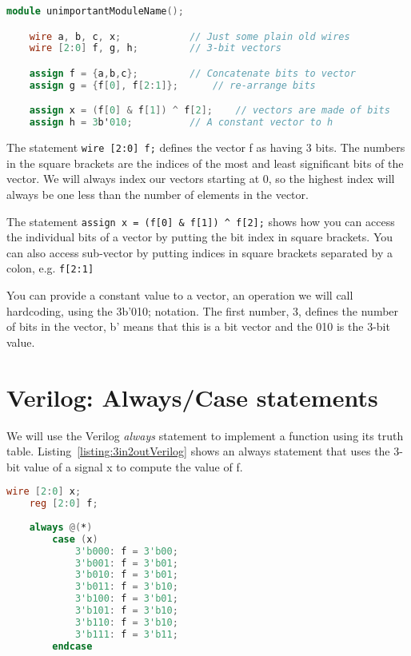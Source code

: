 \begin{lstlisting}[language=Verilog,
 caption={Verilog code which illustrates vector manipulations and declarations.},
 label={listing:vectorManipulation},
 frame=single]
module unimportantModuleName();

    wire a, b, c, x;			// Just some plain old wires
    wire [2:0] f, g, h;			// 3-bit vectors

    assign f = {a,b,c};			// Concatenate bits to vector
    assign g = {f[0], f[2:1]};		// re-arrange bits

    assign x = (f[0] & f[1]) ^ f[2];	// vectors are made of bits
    assign h = 3b'010;			// A constant vector to h
\end{lstlisting}

The statement \verb+wire [2:0] f;+ defines the vector f as having 3 bits. 
The numbers in the square brackets are the indices of the most and least significant
bits of the vector. We will always index our vectors starting at 0, so
the highest index will always be one less than the number of elements in
the vector.

The statement \verb+assign x = (f[0] & f[1]) ^ f[2];+ shows how
you can access the individual bits of a vector by putting the bit index in
square brackets. You can also access sub-vector by putting indices in
square brackets separated by a colon, e.g. \verb+f[2:1]+

You can provide a constant value to a vector, an operation we will call
hardcoding, using the 3b'010; notation. The first number, 3, defines the 
number of bits in the vector, b' means that this is a bit vector and the 010 is
the 3-bit value.

\section{Verilog: Always/Case statements}

We will use the Verilog \emph{always} statement to implement a function
using its truth table. Listing~\ref{listing:3in2outVerilog} shows an always 
statement that uses the 3-bit value of a signal x to compute the value of f.

\begin{lstlisting}[language=Verilog,
 caption={A 3-input, 2-output function realized with an always statement.
 Can you figure out how the output was computed?},
 label={listing:3in3outVerilog},
 frame=single]
    wire [2:0] x;
    reg [2:0] f;
    
    always @(*)
        case (x)
            3'b000: f = 3'b00;
            3'b001: f = 3'b01;
            3'b010: f = 3'b01;
            3'b011: f = 3'b10;
            3'b100: f = 3'b01;
            3'b101: f = 3'b10;
            3'b110: f = 3'b10;
            3'b111: f = 3'b11;
        endcase
\end{lstlisting}

